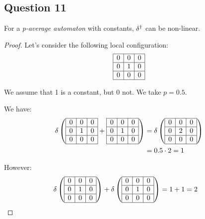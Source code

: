 
\subsection*{Question 11}

 \begin{prop}
    For a \textit{p-average automaton} with constants, $\delta^{\dag}$ can be non-linear.
 \end{prop}

 \begin{proof}
   Let's consider the following local configuration:
   \[\begin{array}{ | c | c | c |} \hline
    0 & 0 & 0 \\ \hline
    0 & 1 & 0 \\ \hline
    0 & 0 & 0 \\ \hline
  \end{array}\]
  
  We assume that 1 is a constant, but 0 not. We take $p=0.5$.
  
  We have:
 \[\begin{split}
 \delta \left(\begin{array}{ | c | c | c |} \hline
  0 & 0 & 0 \\ \hline
  0 & 1 & 0 \\ \hline
  0 & 0 & 0 \\ \hline
 \end{array} + \begin{array}{ | c | c | c |} \hline
  0 & 0 & 0 \\ \hline
  0 & 1 & 0 \\ \hline
  0 & 0 & 0 \\ \hline
 \end{array} \right) & = \delta \left(\begin{array}{ | c | c | c |} \hline
  0 & 0 & 0 \\ \hline
  0 & 2 & 0 \\ \hline
  0 & 0 & 0 \\ \hline
 \end{array} \right) \\
		     & = 0.5 \cdot 2 = 1    
 \end{split}\]  
  
  However:
 \[\begin{split}
 \delta \left(\begin{array}{ | c | c | c |} \hline
  0 & 0 & 0 \\ \hline
  0 & 1 & 0 \\ \hline
  0 & 0 & 0 \\ \hline
 \end{array}\right) + \delta \left(\begin{array}{ | c | c | c |} \hline
  0 & 0 & 0 \\ \hline
  0 & 1 & 0 \\ \hline
  0 & 0 & 0 \\ \hline
 \end{array} \right) & = 1 + 1 = 2
 \end{split}\]  
  

\end{proof}
